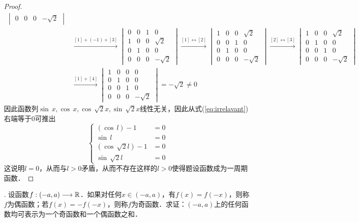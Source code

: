 \begin{proof}
\begin{align}
\begin{vmatrix}
            0 & 0 & 0 & -\sqrt{2}
    \end{vmatrix} \\
    &\xrightarrow{[1] + (-1) \times [3]} \begin{vmatrix}
        0 & 0 & 1 & 0 \\
        1 & 0 & 0 & \sqrt{2} \\
        0 & 1 & 0 & 0 \\
        0 & 0 & 0 & -\sqrt{2}
    \end{vmatrix} \xrightarrow{[1] \longleftrightarrow [2]} \begin{vmatrix}
        1 & 0 & 0 & \sqrt{2} \\
        0 & 0 & 1 & 0 \\
        0 & 1 & 0 & 0 \\
        0 & 0 & 0 & -\sqrt{2}
    \end{vmatrix} \xrightarrow{[2] \longleftrightarrow [3]} \begin{vmatrix}
            1 & 0 & 0 & \sqrt{2} \\
            0 & 1 & 0 & 0 \\
            0 & 0 & 1 & 0 \\
            0 & 0 & 0 & -\sqrt{2}
    \end{vmatrix} \\
    &\xrightarrow{[1] + [4]} \begin{vmatrix}
        1 & 0 & 0 & 0 \\
            0 & 1 & 0 & 0 \\
            0 & 0 & 1 & 0 \\
            0 & 0 & 0 & -\sqrt{2}
    \end{vmatrix} = -\sqrt{2} \neq 0
\end{align}
因此函数列$\sin \, x, \cos \, x, \cos \, \sqrt{2}x , \sin \, \sqrt{2} x$线性无关，因此从式(\ref{eq:irrelavant})右端等于$0$可推出
\begin{equation}
    \begin{cases}
        (\cos \, l) - 1 &= 0 \\
        \sin \, l &= 0 \\
        (\cos \, \sqrt{2} l) - 1 &= 0 \\
        \sin \, \sqrt{2} l &= 0
    \end{cases}
\end{equation}
这说明$l = 0$，从而与$l > 0$矛盾，从而不存在这样的$l > 0$使得题设函数成为一周期函数．
\end{proof}

. 设函数$f: (-a, a) \longrightarrow \mathbb{R}$．如果对任何$x \in (-a, a)$，有$f(x) = f(-x)$，则称$f$为偶函数；若$f(x) = -f(-x)$，则称$f$为奇函数．求证：$(-a, a)$上的任何函数均可表示为一个奇函数和一个偶函数之和．

